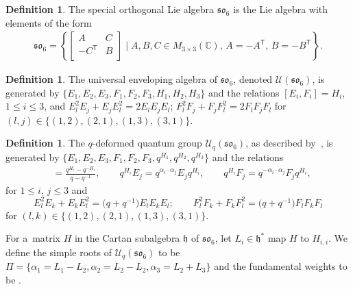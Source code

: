 \documentclass[pdftex]{sigma}
\numberwithin{equation}{section}
\theoremstyle{definition}
\newtheorem{Definition}[Theorem]{Definition}
\begin{document}
\begin{Definition}
 The special orthogonal Lie algebra $\mathfrak{so}_{6}$ is the Lie algebra with elements of the form
 \begin{align*}
 \mathfrak{so}_{6} = \left\{\begin{bmatrix}
 A & C \\
 -C^{\mathsf{T}} & B \\
 \end{bmatrix}\mid A,B,C \in M_{3 \times 3} (\mathbb{C}),\, A = - A^{\mathsf{T}},\, B=-B^{\mathsf{T}}\right\}.
 \end{align*}
\end{Definition}


\begin{Definition}
 The universal enveloping algebra of $\mathfrak{so}_6$, denoted $\mathcal{U}(\mathfrak{so}_6)$, is generated by
 $\{E_1, E_2, E_3, F_1, F_2, F_3, H_1, H_2, H_3\}$ and the relations $[E_i, F_i] = H_i$, $1 \leq i \leq 3$, and $ E_l^2E_j + E_jE_l^2 = 2E_lE_jE_l$; $ F_l^2F_j + F_jF_l^2 = 2F_lF_jF_l$
 for $(l,j) \in \{ (1,2), (2,1), (1,3), (3,1) \}$.
\end{Definition}

\begin{Definition}
 The $q$-deformed quantum group $\mathcal{U}_q(\mathfrak{so}_6)$, as described by~\cite{Drinfeld85,Jimbo85}, is generated by $\bigl\{E_1, E_2, E_3, F_1, F_2, F_3, q^{H_1}, q^{H_2}, q^{H_3}\bigr\}$ and the relations
 \begin{align*}
 [E_i, F_i] &= \frac{q^{H_i} - q^{-H_i}}{q-q^{-1}}, \qquad
 q^{H_i}E_j = q^{\alpha_i \cdot \alpha_j}E_j q^{H_i}, \qquad
 q^{H_i}F_j = q^{-\alpha_i \cdot \alpha_j}F_j q^{H_i},
 \end{align*}
 for $ 1 \leq i$, $j \leq 3$ and
  \[
  E_l^2E_k + E_kE_l^2 = \bigl(q+q^{-1}\bigr)E_lE_kE_l; \qquad  F_l^2F_k + F_kF_l^2 = \bigl(q+q^{-1}\bigr)F_lF_kF_l
   \]
   for $(l,k) \in \{ (1,2), (2,1), (1,3), (3,1) \}$.

 For a~matrix $H$ in the Cartan subalgebra $\mathfrak{h}$ of $\mathfrak{so}_6$, let $L_i \in \mathfrak{h}^*$ map $H$ to $H_{i,i}$. We define the simple roots of $\mathcal{U}_q(\mathfrak{so}_6)$ to be $\Pi = \{\alpha_1 = L_1 - L_2, \alpha_2 = L_2 - L_2, \alpha_3 = L_2 + L_3\} $
 and the fundamental weights to be .
\end{Definition}
\end{document}
